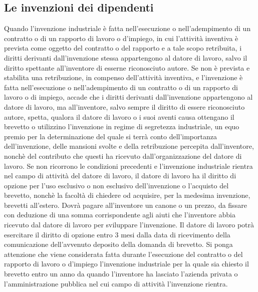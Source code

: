 \subsection{Le invenzioni dei dipendenti}
Quando l'invenzione industriale è fatta nell'esecuzione o nell'adempimento di un contratto o di un rapporto di lavoro o d'impiego, in cui
l'attività inventiva è prevista come oggetto del contratto o del rapporto e a tale scopo retribuita, i diritti derivanti dall'invenzione stessa
appartengono al datore di lavoro, salvo il diritto spettante all'inventore di esserne riconosciuto autore.\newline
Se non è prevista e stabilita una retribuzione, in compenso dell'attività inventiva, e l'invenzione è fatta nell'esecuzione o nell'adempimento
di un contratto o di un rapporto di lavoro o di impiego, accade che i diritti derivanti dall'invenzione appartengono al datore di lavoro,
ma all'inventore, salvo sempre il diritto di essere riconosciuto autore, spetta, qualora il datore di lavoro o i suoi aventi causa ottengano il brevetto
o utilizzino l'invenzione in regime di segretezza industriale, un equo premio per la determinazione del quale si terrà conto dell'importanza
dell'invenzione, delle mansioni svolte e della retribuzione percepita dall'inventore, nonchè del contributo che questi ha ricevuto dall'organizzazione
del datore di lavoro.\newline
Se non ricorrono le condizioni precedenti e l'invenzione industriale rientra nel campo di attività del datore di lavoro, il datore di lavoro
ha il diritto di opzione per l'uso esclusivo o non esclusivo dell'invenzione o l'acquisto del brevetto, nonchè la facoltà di chiedere od acquisire, per
la medesima invenzione, brevetti all'estero. Dovrà pagare all'inventore un canone o un prezzo, da fissare con deduzione di una somma corrispondente agli aiuti
che l'inventore abbia ricevuto dal datore di lavoro per sviluppare l'invenzione. Il datore di lavoro potrà esercitare il diritto di opzione entro 3 mesi
dalla data di ricevimento della comunicazione dell'avvenuto deposito della domanda di brevetto.\newline
\newline
Si ponga attenzione che viene considerata fatta durante l'esecuzione del contratto o del rapporto di lavoro o d'impiego l'invenzione industriale
per la quale sia chiesto il brevetto entro un anno da quando l'inventore ha lasciato l'azienda privata o l'amministrazione pubblica nel cui campo di
attività l'invenzione rientra.

